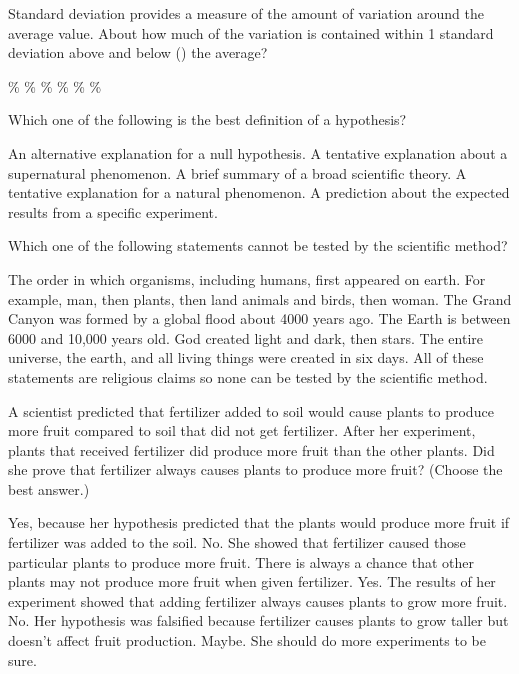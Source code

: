 \begin{choices}
\question
Standard deviation provides a measure of the amount of variation around the average value. About how much of the variation is contained within 1 standard deviation above and below (\pm) the average?

\begin{choices}
\%%
\%%
\%%
\%%
\%%
\%%
\end{choices}

\question
Which one of the following is the best definition of a hypothesis?

\begin{choices}
\choice An alternative explanation for a null hypothesis.%
\choice A tentative explanation about a supernatural phenomenon.%
\choice A brief summary of a broad scientific theory.%
\choice A tentative explanation for a natural phenomenon.%
\choice A prediction about the expected results from a specific experiment.%

\question
Which one of the following statements cannot be tested by the scientific method?

\begin{choices}
\choice The order in which organisms, including humans, first appeared on earth. For example, man, then plants, then land animals and birds, then woman.%
\choice The Grand Canyon was formed by a global flood about 4000 years ago.%
\choice The Earth is between 6000 and 10,000 years old.%
\choice God created light and dark, then stars.%
\choice The entire universe, the earth, and all living things were created in six days.%
\choice All of these statements are religious claims so none can be tested by the scientific method.%
\end{choices}

\question
A scientist predicted that fertilizer added to soil would cause plants to produce more fruit compared to soil that did not get fertilizer. After her experiment, plants that received fertilizer did produce more fruit than the other plants. Did she prove that fertilizer always causes plants to produce more fruit? (Choose the best answer.)

\begin{choices}
\choice Yes, because her hypothesis predicted that the plants would produce more fruit if fertilizer was added to the soil.%
\choice No. She showed that fertilizer caused those particular plants to produce more fruit. There is always a chance that other plants may not produce more fruit when given fertilizer.%
\choice Yes. The results of her experiment showed that adding fertilizer always causes plants to grow more fruit.%
\choice No. Her hypothesis was falsified because fertilizer causes plants to grow taller but doesn't affect fruit production.%
\choice Maybe. She should do more experiments to be sure.%
\end{choices}


\end{choices}
\end{choices}
